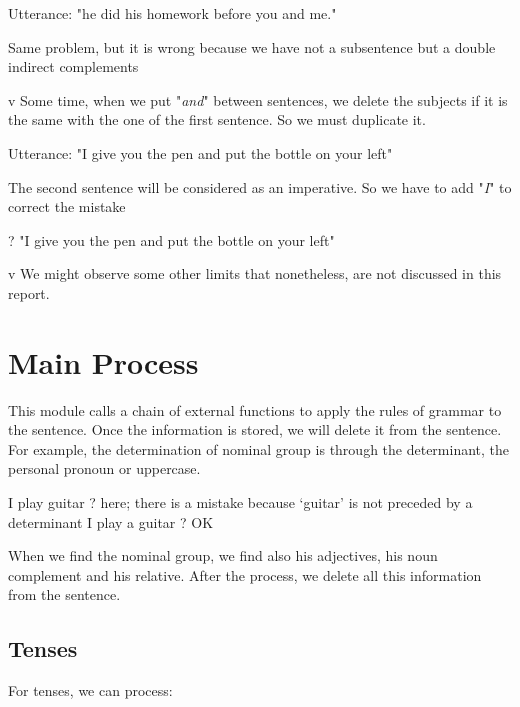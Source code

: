 \documentclass[twoside,a4paper,10pt]{report}
\begin{document}
\small
\begin{verbatimtab}
  Utterance: "he did his homework before you and me."
\end{verbatimtab}
\normalsize
Same problem, but it is wrong because we have not a subsentence but a double indirect complements

v  Some time, when we put "\textsl{and}" between sentences, we delete the subjects if it is the same with the one of the first sentence. So we must duplicate it.


\small
\begin{verbatimtab}
  Utterance: "I give you the pen and put the bottle on your left"
\end{verbatimtab}
\normalsize
The second sentence will be considered as an imperative. So we have to add "\textsl{I}" to correct the mistake


\small
\begin{verbatimtab}
  ? "I give you the pen and put the bottle on your left"
\end{verbatimtab}
\normalsize

v  We might observe some other limits that nonetheless, are not discussed in this report.


\section{Main Process}
\label{0e76170b5e24f80d8e04eca241527e68}%
This module calls a chain of external functions to apply the rules of grammar to the sentence.  Once the information is stored, we will delete it from the sentence. For example, the determination of nominal group is through the determinant, the personal pronoun or uppercase.


\small
\begin{verbatimtab}
  I play guitar ? here; there is a mistake because ‘guitar’ is not preceded by a determinant
  I play a guitar ? OK
\end{verbatimtab}
\normalsize
When we find the nominal group, we find also his adjectives, his noun complement and his relative. After the process, we delete all this information from the sentence.


\subsection{Tenses}
\label{7664bb61dad550e6b91636502af4e390}%
For tenses, we can process:
\end{document}
